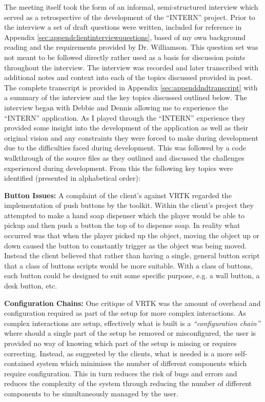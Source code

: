 \documentclass{l4proj}
\begin{document}
The meeting itself took the form of an informal, semi-structured interview which served as a retrospective of the development of the ``INTERN'' project. Prior to the interview a set of draft questions were written, included for reference in Appendix \ref{sec:appendclientinterviewquestions}, based of my own background reading and the requirements provided by Dr. Williamson. This question set was not meant to be followed directly rather used as a basis for discussion points throughout the interview. The interview was recorded and later transcribed with additional notes and context into each of the topics discussed provided in post. The complete transcript is provided in Appendix \ref{sec:appenddndtranscript} with a summary of the interview and the key topics discussed outlined below. The interview began with Debbie and Dennis allowing me to experience the ``INTERN'' application. As I played through the ``INTERN'' experience they provided some insight into the development of the application as well as their original vision and any constraints they were forced to make during development due to the difficulties faced during development. This was followed by a code walkthrough of the source files as they outlined and discussed the challenges experienced during development. From this the following key topics were identified (presented in alphabetical order):

\textbf{Button Issues:}
A complaint of the client's against VRTK regarded the implementation of push buttons by the toolkit. Within the client's project they attempted to make a hand soap dispenser which the player would be able to pickup and then push a button the top of to dispense soap. In reality what occurred was that when the player picked up the object, moving the object up or down caused the button to constantly trigger as the object was being moved. Instead the client believed that rather than having a single, general button script that a class of buttons scripts would be more suitable. With a class of buttons, each button could be designed to suit some specific purpose, e.g. a wall button, a desk button, etc.

\textbf{Configuration Chains:}
One critique of VRTK was the amount of overhead and configuration required as part of the setup for more complex interactions. As complex interactions are setup, effectively what is built is a \textit{``configuration chain''} where should a single part of the setup be removed or misconfigured, the user is provided no way of knowing which part of the setup is missing or requires correcting. Instead, as suggested by the clients, what is needed is a more self-contained system which minimises the number of different components which require configuration. This in turn reduces the risk of bugs and errors and reduces the complexity of the system through reducing the number of different components to be simultaneously managed by the user.
\end{document}
